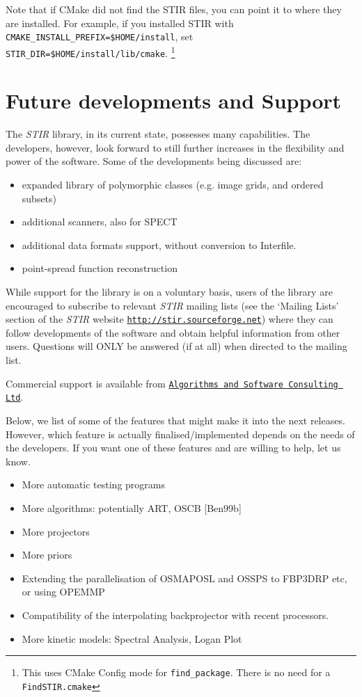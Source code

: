 \documentclass{article}
\def\url#1#2{\mbox{\href{#1}{\tt #2}}}
\begin{document}
{{{{{{Note that if CMake did not find the STIR files, you can point it to where they are installed.
For example, if you installed STIR with
\texttt{CMAKE\_INSTALL\_PREFIX=\$HOME/install}, set
\texttt{STIR\_DIR=\$HOME/install/lib/cmake}.
\footnote{This uses CMake Config mode for \texttt{find\_package}. There is no need for a \texttt{FindSTIR.cmake}}

\section{
Future developments and Support}

The \textit{STIR} library, in its current state, possesses many capabilities. 
The developers, however, look forward to still further increases 
in the flexibility and power of the software. Some of the developments 
being discussed are:

\begin{itemize}
\item
expanded library of polymorphic classes (e.g. image grids, and 
ordered subsets)
\item
additional scanners, also for SPECT
\item
additional data formats support, without conversion to Interfile.
\item
point-spread function reconstruction
\end{itemize}


While support for the library is on a voluntary basis, users 
of the library are encouraged to subscribe to relevant \textit{STIR} 
mailing lists (see the `Mailing Lists' section of the \textit{STIR} website 
\url{http://stir.sourceforge.net/ }{http://stir.sourceforge.net}) 
where they can follow developments of the software and obtain 
helpful information from other users. Questions will ONLY be 
answered (if at all) when directed to the mailing list.

Commercial support is available from \url{http://asc.uk.com}{Algorithms and
Software Consulting Ltd}.

Below, we list of some of the features that might make it into the next releases. 
However, which feature is actually finalised/implemented depends 
on the needs of the developers. If you want one of these features 
and are willing to help, let us know.
\begin{itemize}
\item
More automatic testing programs
\item
More algorithms: potentially ART,  
OSCB [Ben99b] 
\item
More projectors
\item
More priors
\item
Extending the parallelisation of OSMAPOSL and OSSPS to FBP3DRP etc, or using OPEMMP
\item
Compatibility of the interpolating backprojector with recent 
processors.
\item
More kinetic models: Spectral Analysis, Logan Plot
\end{itemize}





}}}}}}
\end{document}
